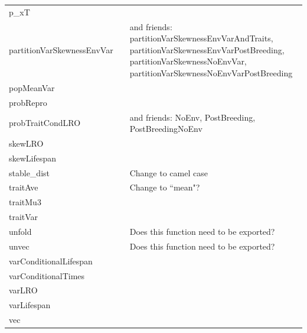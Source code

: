 \documentclass[11pt]{article}
\begin{document}
\begin{linenumbers}
\begin{table}[ptb]
\begin{center}
\begin{tabular}{lp{0.1cm}p{10.5cm}}
      p\_xT && \\
      partitionVarSkewnessEnvVar && and friends: partitionVarSkewnessEnvVarAndTraits, partitionVarSkewnessEnvVarPostBreeding, partitionVarSkewnessNoEnvVar, partitionVarSkewnessNoEnvVarPostBreeding \\
      popMeanVar && \\
      probRepro && \\
      probTraitCondLRO && and friends: NoEnv, PostBreeding, PostBreedingNoEnv \\
      skewLRO && \\
      skewLifespan && \\
      stable\_dist && Change to camel case \\
      traitAve && Change to ``mean"? \\
      traitMu3 && \\
      traitVar && \\
      unfold && Does this function need to be exported? \\
      unvec && Does this function need to be exported? \\
      varConditionalLifespan && \\
      varConditionalTimes && \\
      varLRO && \\
      varLifespan && \\
      vec && \\
      \hline
    \end{tabular}
   \normalsize
  \end{center}
  \renewcommand{\arraystretch}{1}
\end{table}

\end{linenumbers}

\end{document}
